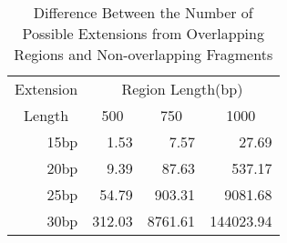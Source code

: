 \begin{table}[bth]
\caption{Difference Between the Number of Possible Extensions from Overlapping
Regions and Non-overlapping Fragments}
\label{table4}
\begin{center}
\begin{tabular}{||r|rrr||}  \hline
\multicolumn{1}{||c|}{Extension} & \multicolumn{3}{c||}{Region Length(bp)} \\ 
\multicolumn{1}{||c|}{Length}
& \multicolumn{1}{c}{500} & \multicolumn{1}{c}{750}
& \multicolumn{1}{c||}{1000} \\ \hline
15bp &   1.53 &    7.57 &     27.69 \\
20bp &   9.39 &   87.63 &    537.17 \\
25bp &  54.79 &  903.31 &   9081.68 \\
30bp & 312.03 & 8761.61 & 144023.94 \\ \hline
\end{tabular}
\end{center}
\end{table}
